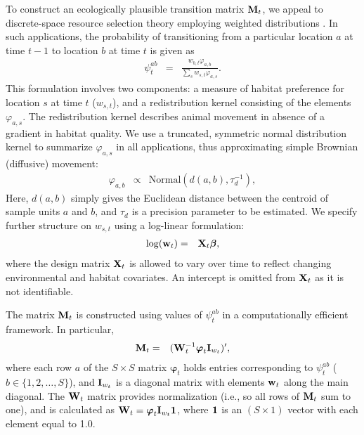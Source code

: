 \documentclass[12pt,fleqn]{article}
\begin{document}
\begin{flushleft}
\hspace{.5in}To construct an ecologically plausible transition matrix ${\bf M}_t$, we appeal to discrete-space resource selection theory employing weighted distributions \citep[cf.,][]{PatilRao1978,LeleKeim2006,JohnsonEtAl2008}.  In such applications, the probability of transitioning from a particular location $a$ at time $t-1$ to location $b$ at time $t$ is given as
\begin{eqnarray*}
  \psi^{ab}_t & = & \frac{w_{b,t} \varphi_{a,b}}{\sum_s w_{s,t} \varphi_{a,s}}. \label{eq:psi}
\end{eqnarray*}
This formulation involves two components: a measure of habitat preference for location $s$ at time $t$ ($w_{s,t}$), and a redistribution kernel consisting of the elements $\varphi_{a,s}$.  The redistribution kernel describes animal movement in absence of a gradient in habitat quality.  We use a truncated, symmetric normal distribution kernel to summarize $\varphi_{a,s}$ in all applications, thus approximating simple Brownian (diffusive) movement:
\begin{eqnarray*}
  \varphi_{a,b} & \propto & \textrm{Normal}(d(a,b),\tau_d^{-1}), \label{eq:varphi}
\end{eqnarray*}
Here, $d(a,b)$ simply gives the Euclidean distance between the centroid of sample units $a$ and $b$, and $\tau_d$ is a precision parameter to be estimated.  We specify further structure on $w_{s,t}$ using a log-linear formulation:
\begin{eqnarray*}
  \log({\bf w}_t) & = & {\bf X}_t \boldsymbol{\beta}, %
\end{eqnarray*}
where the design matrix ${\bf X}_t$ is allowed to vary over time to reflect changing environmental and habitat covariates.  An intercept is omitted from ${\bf X}_t$ as it is not identifiable.

\hspace{.5in}The matrix ${\bf M}_t$ is constructed using values of $\psi_t^{ab}$ in a computationally efficient framework.  In particular,
\begin{eqnarray}
  {\bf M}_t & = & ({\bf W}_t^{-1} \boldsymbol{\varphi}_t {\bf I}_{w_t})^\prime, \label{eq:M}
\end{eqnarray}
where each row $a$ of the $S \times S$ matrix $\boldsymbol{\varphi}_t$ holds entries corresponding to $\psi_t^{ab}$ ($b \in \{ 1,2,\hdots,S \}$), and ${\bf I}_{w_t}$ is a diagonal matrix with elements ${\bf w}_t$ along the main diagonal.  The  ${\bf W}_t$ matrix provides normalization (i.e., so all rows of ${\bf M}_t$ sum to one), and is calculated as ${\bf W}_t = \boldsymbol{\varphi}_t {\bf I}_{w_t} {\bf 1}$, where ${\bf 1}$ is an $(S \times 1)$ vector with each element equal to 1.0.


\end{flushleft}
\end{document}
